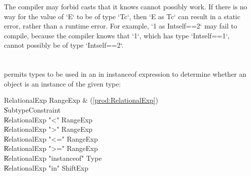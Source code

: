 The compiler may forbid casts that it knows cannot possibly work. If there is
no way for the value of \xcd`E` to be of type \xcd`T{c}`, then 
\xcd`E as T{c}` can result in a static error, rather than a runtime error.  
For example, \xcd`1 as Int{self==2}` may fail to compile, because the compiler
knows that \xcd`1`, which has type \xcd`Int{self==1}`, cannot possibly be of
type \xcd`Int{self==2}`. 









\section{}
\label{instanceOf}

\Xten{} permits types to be used in an in instanceof expression
to determine whether an object is an instance of the given type:

\begin{bbgrammar}
       RelationalExp \: RangeExp & (\ref{prod:RelationalExp}) \\
                    \| SubtypeConstraint \\
                    \| RelationalExp \xcd"<" RangeExp \\
                    \| RelationalExp \xcd">" RangeExp \\
                    \| RelationalExp \xcd"<=" RangeExp \\
                    \| RelationalExp \xcd">=" RangeExp \\
                    \| RelationalExp \xcd"instanceof" Type \\
                    \| RelationalExp \xcd"in" ShiftExp \\
\end{bbgrammar}


